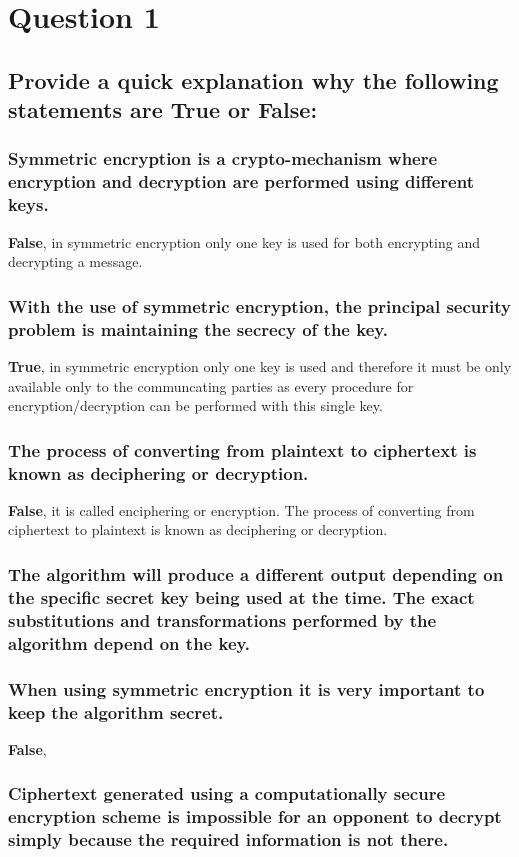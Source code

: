 \documentclass{report}
\begin{document}
	\section{Question 1}
	\startsection
		\renewcommand{\thesubsection}{\thesection.\Alph{subsection}}
		\subsection{Provide a quick explanation why the following statements are True or False:}
		\startsubsection
			\subsubsection{Symmetric encryption is a crypto-mechanism where encryption and decryption are performed using different keys.}
			\startsubsection
				\textbf{False}, in symmetric encryption only one key is used for both encrypting and decrypting a message.
			\closesection
			\subsubsection{With the use of symmetric encryption, the principal security problem is maintaining the secrecy of the key.}
			\startsubsection
				\textbf{True}, in symmetric encryption only one key is used and therefore it must be only available only to the communcating parties as every procedure for encryption/decryption can be performed with this single key.
			\closesection
			\subsubsection{The process of converting from plaintext to ciphertext is known as deciphering or decryption.}
			\startsubsection
				\textbf{False}, it is called enciphering or encryption. The process of converting from ciphertext to plaintext is known as deciphering or decryption.
			\closesection
			\subsubsection{The algorithm will produce a different output depending on the specific secret key being used at the time. The exact substitutions and transformations performed by the algorithm depend on the key.}
			\startsubsection
			\closesection
			\subsubsection{When using symmetric encryption it is very important to keep the algorithm secret.}
			\startsubsection
				\textbf{False},
			\closesection
			\subsubsection{Ciphertext generated using a computationally secure encryption scheme is impossible for an opponent to decrypt simply because the required information is not there.}
			\startsubsection
			\closesection
		\closesection
	\closesection
\end{document}
